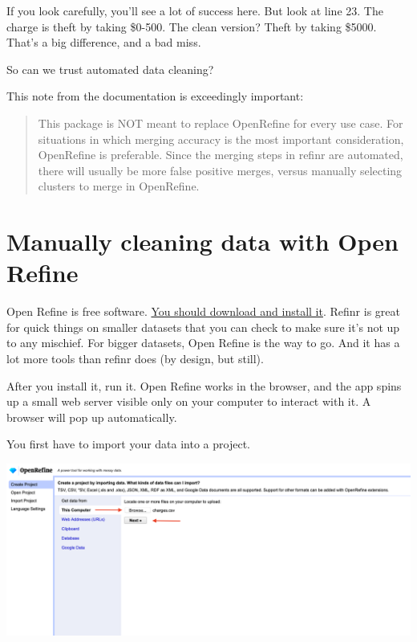 \documentclass[]{book}
\begin{document}
If you look carefully, you'll see a lot of success here. But look at line 23. The charge is theft by taking \$0-500. The clean version? Theft by taking \$5000. That's a big difference, and a bad miss.

So can we trust automated data cleaning?

This note from the documentation is exceedingly important:

\begin{quote}
This package is NOT meant to replace OpenRefine for every use case. For situations in which merging accuracy is the most important consideration, OpenRefine is preferable. Since the merging steps in refinr are automated, there will usually be more false positive merges, versus manually selecting clusters to merge in OpenRefine.
\end{quote}

\hypertarget{manually-cleaning-data-with-open-refine}{%
\section{Manually cleaning data with Open Refine}\label{manually-cleaning-data-with-open-refine}}

Open Refine is free software. \href{https://openrefine.org/}{You should download and install it}. Refinr is great for quick things on smaller datasets that you can check to make sure it's not up to any mischief. For bigger datasets, Open Refine is the way to go. And it has a lot more tools than refinr does (by design, but still).

After you install it, run it. Open Refine works in the browser, and the app spins up a small web server visible only on your computer to interact with it. A browser will pop up automatically.

You first have to import your data into a project.

\includegraphics[width=35.44in]{images/open1}
\end{document}
